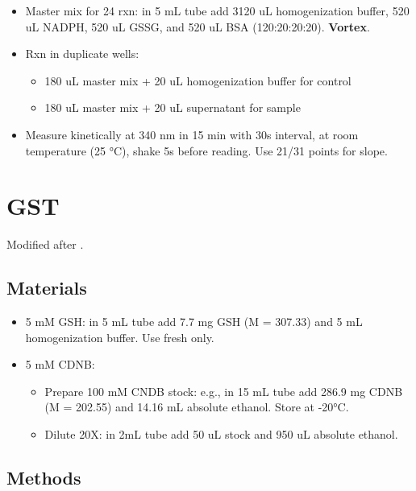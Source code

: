 \documentclass[
]{book}
\providecommand{\tightlist}{%
  \setlength{\itemsep}{0pt}\setlength{\parskip}{0pt}}
\begin{document}
\begin{itemize}
\tightlist
\item
  Master mix for 24 rxn: in 5 mL tube add 3120 uL homogenization buffer, 520 uL NADPH, 520 uL GSSG, and 520 uL BSA (120:20:20:20). \textbf{Vortex}.
\item
  Rxn in duplicate wells:

  \begin{itemize}
  \tightlist
  \item
    180 uL master mix + 20 uL homogenization buffer for control
  \item
    180 uL master mix + 20 uL supernatant for sample
  \end{itemize}
\item
  Measure kinetically at 340 nm in 15 min with 30s interval, at room temperature (25 °C), shake 5s before reading. Use 21/31 points for slope.
\end{itemize}

\hypertarget{GST}{%
\chapter{GST}\label{GST}}

Modified after \textcite{habig1974}.

\hypertarget{materials-8}{%
\section{Materials}\label{materials-8}}

\begin{itemize}
\tightlist
\item
  5 mM GSH: in 5 mL tube add 7.7 mg GSH (M = 307.33) and 5 mL homogenization buffer. Use fresh only.
\item
  5 mM CDNB:

  \begin{itemize}
  \tightlist
  \item
    Prepare 100 mM CNDB stock: e.g., in 15 mL tube add 286.9 mg CDNB (M = 202.55) and 14.16 mL absolute ethanol. Store at -20°C.
  \item
    Dilute 20X: in 2mL tube add 50 uL stock and 950 uL absolute ethanol.
  \end{itemize}
\end{itemize}

\hypertarget{methods-8}{%
\section{Methods}\label{methods-8}}
\end{document}
